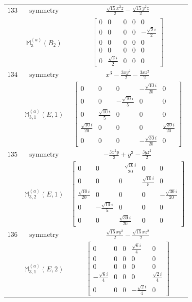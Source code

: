 \documentclass[fleqn,8pt,landscape]{jsarticle}
\begin{document}
\begin{longtable}{ccc}
$ 133 $ & $ \text{symmetry} $ & $ \frac{\sqrt{15} x^{2} z}{2} - \frac{\sqrt{15} y^{2} z}{2} $ \\
$  $ & $ \mathbb{M}_{3}^{(a)}(B_{2}) $ & $ \begin{bmatrix} 0 & 0 & 0 & 0 & 0 \\ 0 & 0 & 0 & 0 & - \frac{\sqrt{2} i}{2} \\ 0 & 0 & 0 & 0 & 0 \\ 0 & 0 & 0 & 0 & 0 \\ 0 & \frac{\sqrt{2} i}{2} & 0 & 0 & 0 \end{bmatrix} $ \\ \hline
$ 134 $ & $ \text{symmetry} $ & $ x^{3} - \frac{3 x y^{2}}{2} - \frac{3 x z^{2}}{2} $ \\
$  $ & $ \mathbb{M}_{3,1}^{(a)}(E,1) $ & $ \begin{bmatrix} 0 & 0 & 0 & - \frac{\sqrt{10} i}{20} & 0 \\ 0 & 0 & - \frac{\sqrt{10} i}{5} & 0 & 0 \\ 0 & \frac{\sqrt{10} i}{5} & 0 & 0 & 0 \\ \frac{\sqrt{10} i}{20} & 0 & 0 & 0 & \frac{\sqrt{30} i}{20} \\ 0 & 0 & 0 & - \frac{\sqrt{30} i}{20} & 0 \end{bmatrix} $ \\ \hline
$ 135 $ & $ \text{symmetry} $ & $ - \frac{3 x^{2} y}{2} + y^{3} - \frac{3 y z^{2}}{2} $ \\
$  $ & $ \mathbb{M}_{3,2}^{(a)}(E,1) $ & $ \begin{bmatrix} 0 & 0 & - \frac{\sqrt{10} i}{20} & 0 & 0 \\ 0 & 0 & 0 & \frac{\sqrt{10} i}{5} & 0 \\ \frac{\sqrt{10} i}{20} & 0 & 0 & 0 & - \frac{\sqrt{30} i}{20} \\ 0 & - \frac{\sqrt{10} i}{5} & 0 & 0 & 0 \\ 0 & 0 & \frac{\sqrt{30} i}{20} & 0 & 0 \end{bmatrix} $ \\ \hline
$ 136 $ & $ \text{symmetry} $ & $ \frac{\sqrt{15} x y^{2}}{2} - \frac{\sqrt{15} x z^{2}}{2} $ \\
$  $ & $ \mathbb{M}_{3,1}^{(a)}(E,2) $ & $ \begin{bmatrix} 0 & 0 & 0 & \frac{\sqrt{6} i}{4} & 0 \\ 0 & 0 & 0 & 0 & 0 \\ 0 & 0 & 0 & 0 & 0 \\ - \frac{\sqrt{6} i}{4} & 0 & 0 & 0 & \frac{\sqrt{2} i}{4} \\ 0 & 0 & 0 & - \frac{\sqrt{2} i}{4} & 0 \end{bmatrix} $ \\ \hline

\end{longtable}
\end{document}
